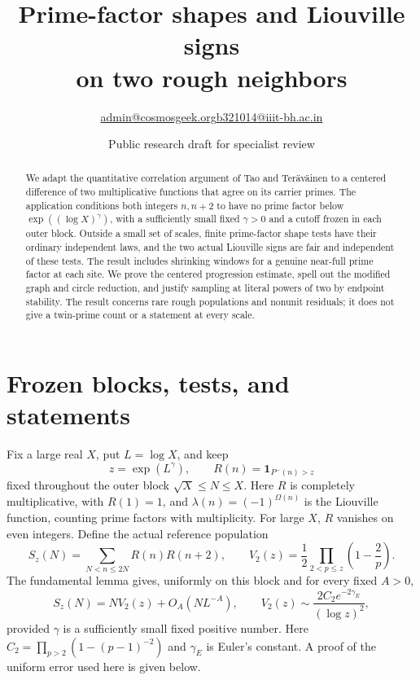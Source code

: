 \documentclass[11pt]{article}
\title{\bfseries Prime-factor shapes and Liouville signs\\on two rough neighbors}
\author{\small \href{mailto:admin@cosmosgeek.org}{admin@cosmosgeek.org}\qquad \href{mailto:b321014@iiit-bh.ac.in}{b321014@iiit-bh.ac.in}}
\date{\small Public research draft for specialist review}
\theoremstyle{remark}\newtheorem{remark}[theorem]{Remark}
\newcommand{\one}{\mathbf 1}
\begin{document}
\maketitle
\begin{abstract}
We adapt the quantitative correlation argument of Tao and Ter\"av\"ainen
to a centered difference of two multiplicative functions that agree on
its carrier primes. The application conditions both integers $n,n+2$
to have no prime factor below $\exp((\log X)^\gamma)$, with a sufficiently
small fixed $\gamma>0$ and a cutoff frozen in each outer block.
Outside a small set of scales, finite prime-factor shape tests have their
ordinary independent laws, and the two actual Liouville signs are fair
and independent of these tests. The result includes shrinking windows
for a genuine near-full prime factor at each site. We prove the centered
progression estimate, spell out the modified graph and circle reduction,
and justify sampling at literal powers of two by endpoint stability.
The result concerns rare rough populations and nonunit residuals; it
does not give a twin-prime count or a statement at every scale.
\end{abstract}

\section{Frozen blocks, tests, and statements}
Fix a large real $X$, put $L=\log X$, and keep
\[
 z=\exp(L^\gamma),\qquad R(n)=\one_{P^-(n)>z}
\]
fixed throughout the outer block $\sqrt X\le N\le X$.
Here $R$ is completely multiplicative, with $R(1)=1$, and
$\lambda(n)=(-1)^{\Omega(n)}$ is the Liouville function, counting
prime factors with multiplicity. For large $X$, $R$ vanishes on even
integers. Define the actual reference population
\[
 S_z(N)=\sum_{N<n\le2N}R(n)R(n+2),\qquad
 V_2(z)=\frac12\prod_{2<p\le z}\left(1-\frac2p\right).
\]
The fundamental lemma gives, uniformly on this block and for every
fixed $A>0$,
\begin{equation}\label{eq:rough-main}
 S_z(N)=NV_2(z)+O_A(NL^{-A}),\qquad
 V_2(z)\sim\frac{2C_2e^{-2\gamma_E}}{(\log z)^2},
\end{equation}
provided $\gamma$ is a sufficiently small fixed positive number.
Here $C_2=\prod_{p>2}(1-(p-1)^{-2})$ and $\gamma_E$ is Euler's constant.
A proof of the uniform error used here is given below.
\end{document}

